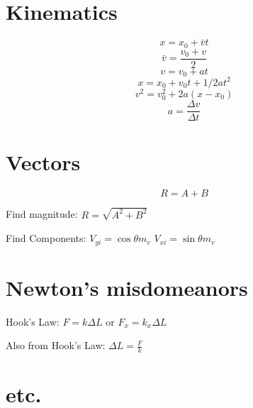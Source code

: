 \documentclass{article}
\begin{document}
\section{Kinematics}
\[ x = x_0 + \bar{v}t\]
\[\bar{v} = \frac{v_0 + v}{2}\]
\[v = v_0 + at\]
\[x = x_0 + v_0t + 1/2 at^2\]
\[v^2 = v_0^2 + 2a(x-x_0)\]
\[a = \frac{\Delta v}{\Delta t}\]
\section{Vectors}
\[R = A + B\]

Find magnitude: $R = \sqrt{A^2 + B^2}$

Find Components: $V_{yi} = \cos \theta m_v$ $V_{xi} = \sin \theta m_v$

\section{Newton's misdomeanors}
Hook's Law: $F = k \Delta L $ or $F_{x} = k_{x} \Delta L $

Also from Hook's Law: $\Delta L = \frac{F}{k}$

\section{etc.}
\end{document}
